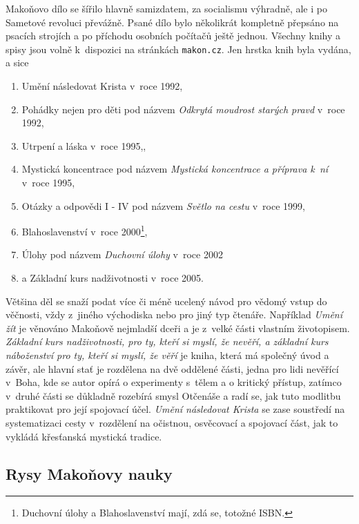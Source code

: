 Makoňovo dílo se šířilo hlavně samizdatem, za socialismu výhradně, ale i po
Sametové revoluci převážně. Psané dílo bylo několikrát kompletně přepsáno na
psacích strojích a po příchodu osobních počítačů ještě jednou. Všechny knihy a
spisy jsou volně k~dispozici na stránkách \texttt{makon.cz}. Jen hrstka knih
byla vydána, a sice
\begin{enumerate}
\item{Umění následovat Krista v~roce 1992\cite{makon1995umeni},}
\item{
    Pohádky nejen pro děti pod názvem {\em Odkrytá moudrost starých
    pravd}\cite{makon1992odkryta} v~roce 1992,
}
\item{Utrpení a láska v~roce 1995\cite{makon1995utrpeni},},
\item{
    Mystická koncentrace pod názvem
    {\em Mystická koncentrace a příprava k~ní}
    v~roce 1995\cite{makon1995mysticka},
}
\item{
    Otázky a odpovědi I - IV pod názvem {\em Světlo na cestu}
    v~roce 1999\cite{makon1999svetlo},
}
\item{
    Blahoslavenství v~roce
    2000\cite{makon2000blahoslavenstvi}\footnote{\label{note1}
        Duchovní úlohy a Blahoslavenství mají, zdá se, totožné ISBN.
    },
}
\item{
    Úlohy pod názvem {\em Duchovní úlohy} v~roce
    2002\cite{makon2002ulohy}
}
\item{a Základní kurs nadživotnosti v~roce 2005\cite{makon2005zakladni}.}
\end{enumerate}

Většina děl se snaží podat více či méně ucelený návod pro vědomý vstup do
věčnosti, vždy z~jiného východiska nebo pro jiný typ čtenáře. Například {\em Umění
žít} je věnováno Makoňově nejmladší dceři a je z~velké části vlastním
životopisem. {\em Základní kurs nadživotnosti, pro ty, kteří si myslí, že nevěří, a
základní kurs náboženství pro ty, kteří si myslí, že věří} je kniha, která má
společný úvod a závěr, ale hlavní stať je rozdělena na dvě oddělené části, jedna
pro lidi nevěřící v~Boha, kde se autor opírá o experimenty s~tělem a o kritický
přístup, zatímco v~druhé části se důkladně rozebírá smysl Otčenáše a radí se,
jak tuto modlitbu praktikovat pro její spojovací účel. {\em Umění následovat
Krista} se zase soustředí na systematizaci cesty v~rozdělení na očistnou,
osvěcovací a spojovací část, jak to vykládá křesťanská mystická tradice.

\subsection{Rysy Makoňovy nauky}

